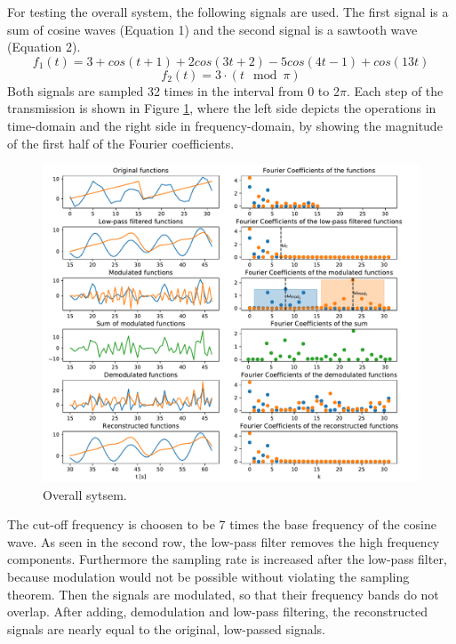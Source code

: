 \documentclass[12pt, a4paper]{report}
\begin{document}
For testing the overall system, the following signals are used.
The first signal is a sum of cosine waves (Equation 1)
and the second signal is a sawtooth wave (Equation 2).
\begin{equation}
	f_1(t) = 3 + cos(t+1) + 2cos(3t+2) - 5cos(4t-1) + cos(13t)
\end{equation}
\begin{equation}
	f_2(t) = 3 \cdot (t\mod\pi)
\end{equation}
Both signals are sampled 32 times in the interval from 0 to 2\(\pi\).
Each step of the transmission is shown in Figure \ref{fig:overall}, where the left side depicts the operations in time-domain
and the right side in frequency-domain, by showing the magnitude of the first half of the Fourier coefficients.
\begin{figure}[h!]
	\centering
	\includegraphics[width=\textwidth]{figures/overall_sampling.pdf}
	\caption{Overall sytsem.}
	\label{fig:overall}
\end{figure}

The cut-off frequency is choosen to be 7 times the base frequency of the cosine wave.
As seen in the second row, the low-pass filter removes the high frequency components.
Furthermore the sampling rate is increased after the low-pass filter,
because modulation would not be possible without violating the sampling theorem.
Then the signals are modulated, so that their frequency bands do not overlap.
After adding, demodulation and low-pass filtering, the reconstructed signals are nearly equal to the original, low-passed signals.
\end{document}
